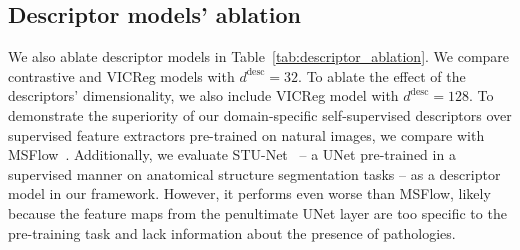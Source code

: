 \subsection{Descriptor models' ablation}
\label{subsec:descriptor_ablation}

We also ablate descriptor models in Table~\ref{tab:descriptor_ablation}. We compare contrastive and VICReg models with ${d^{\text{desc}} = 32}$. To ablate the effect of the descriptors' dimensionality, we also include VICReg model with ${d^{\text{desc}} = 128}$. To demonstrate the superiority of our domain-specific self-supervised descriptors over supervised feature extractors pre-trained on natural images, we compare with MSFlow~\cite{msflow}. Additionally, we evaluate STU-Net~\cite{stu_net} -- a UNet pre-trained in a supervised manner on anatomical structure segmentation tasks -- as a descriptor model in our framework. However, it performs even worse than MSFlow, likely because the feature maps from the penultimate UNet layer are too specific to the pre-training task and lack information about the presence of pathologies.
